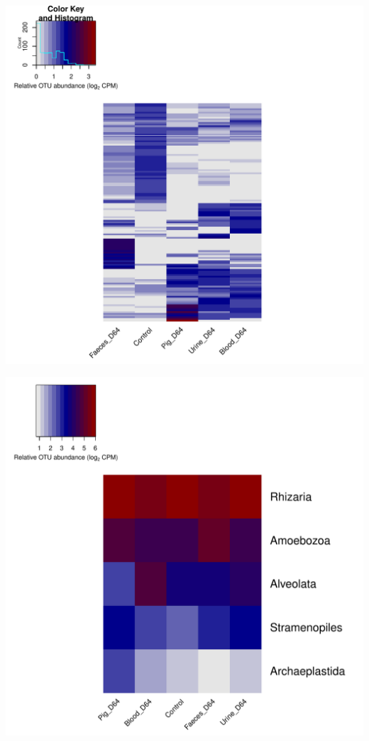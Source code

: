 \documentclass[11pt,english]{article}\usepackage[]{graphicx}\usepackage{xcolor}
\makeatletter
\def\maxwidth{ %
  \ifdim\Gin@nat@width>\linewidth
    \linewidth
  \else
    \Gin@nat@width
  \fi
}
\newenvironment{knitrout}{}{} %
\makeatother
\begin{document}
\begin{knitrout}
\color{fgcolor}
\includegraphics[width=\maxwidth]{figure/image-heatmap-1} 

\includegraphics[width=\maxwidth]{figure/image-heatmap-2} 

\end{knitrout}

% 
% 
\end{document}
